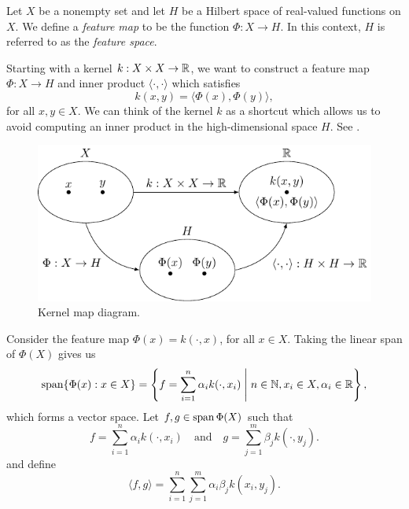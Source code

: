 \begin{definition}
    \cite{hofmann2008kernel}
    Let \(X\) be a nonempty set and let \(H\) be a Hilbert space of real-valued functions on \(X\).
    We define a \textit{feature map} to be the function \(\Phi : X \to H\).
    In this context, \(H\) is referred to as the \textit{feature space}.
\end{definition}

Starting with a kernel \(k : X \times X \to \mathbb{R}\), we want to construct a feature map \(\Phi : X \to H\) and inner product \(\langle \cdot, \cdot \rangle\) which satisfies
\begin{equation}
    \label{eqn:kernel-inner-product-1}
    k(x,y) = \langle \Phi(x), \Phi(y) \rangle,
\end{equation}
for all \(x, y \in X\).
We can think of the kernel \(k\) as a shortcut which allows us to avoid computing an inner product in the high-dimensional space \(H\).
See .

\begin{figure}
    \centering
    \includegraphics[]{figs/fig-kernel-map-diagram}
    \caption{Kernel map diagram.}
    \label{fig:kernel-map-diagram}
\end{figure}

Consider the feature map \(\Phi(x) = k(\cdot, x)\), for all \(x \in X\).
Taking the linear span of \(\Phi(X)\) gives us
\begin{equation}
    \operatorname{span}\{\Phi(x) : x \in X\}
    = \left\{
        f = \sum_{i=1}^{n} \alpha_i k( \cdot, x_i)
        \;\middle|\;
        n \in \mathbb{N}, x_i \in X, \alpha_i \in \mathbb{R}
    \right\},
\end{equation}
which forms a vector space.
Let \(f,g \in \operatorname{span} \Phi(X)\) such that
\begin{equation}
    \label{eqn:function-linear-combo}
    f = \sum_{i=1}^{n} \alpha_i k(\cdot, x_i)
    \quad\text{and}\quad
    g = \sum_{j=1}^{m} \beta_j k(\cdot, y_j).
\end{equation}
and define
\begin{equation}
    \label{eqn:pre-hilbert-inner-product}
    \langle f, g \rangle 
    = \sum_{i=1}^{n} \sum_{j=1}^{m} \alpha_i \beta_j k(x_i, y_j).
\end{equation}

